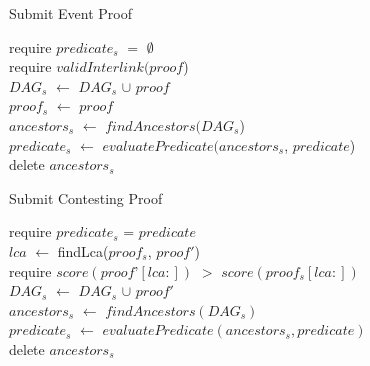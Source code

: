 \begin{algorithm}[H]
    \caption{Submit Event Proof}
    \label{algo:submit_old}
    require $predicate_{s}$ $=$ $\emptyset$ \\
    require $validInterlink(proof$) \\
    $DAG_{s}$ $\leftarrow$ $DAG_{s}$ $\cup$ $proof$\\
    $proof_{s}$ $\leftarrow$ $proof$\\
    $ancestors_{s}$ $\leftarrow$ $findAncestors(DAG_{s}$)\\
    $predicate_{s}$ $\leftarrow$ $evaluatePredicate(ancestors_{s}$,
    $predicate$)\\
    delete $ancestors_{s}$\\
\end{algorithm}

\begin{algorithm}
    \caption{Submit Contesting Proof}
    \label{algo:contest_old}
    require $predicate_{s}$ = $predicate$\\
    $lca$ $\leftarrow$ findLca($proof_{s}$, $proof'$)\\
    require $score(proof’[lca:])$ $>$ $score(proof_{s}[lca:])$ \\
    $DAG_{s}$ $\leftarrow$ $DAG_{s}$ $\cup$ $proof'$\\
    $ancestors_{s}$ $\leftarrow$ $findAncestors(DAG_{s})$\\
    $predicate_{s}$ $\leftarrow$ $evaluatePredicate(ancestors_{s},
    predicate)$\\
    delete $ancestors_{s}$\\
\end{algorithm}
